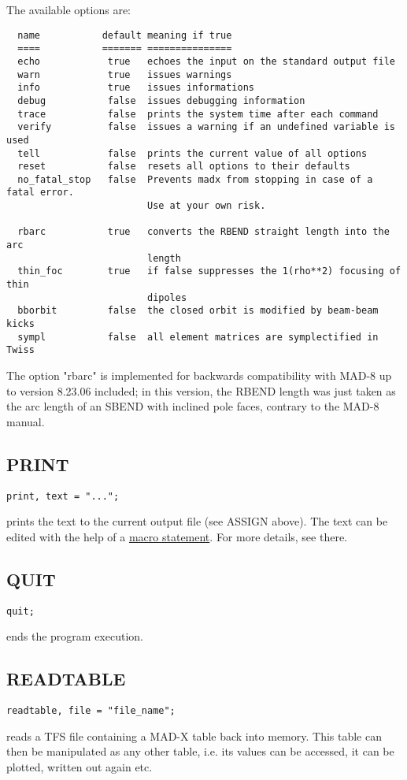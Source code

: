The available options are: 
\begin{verbatim}
  name           default meaning if true
  ====           ======= ===============
  echo            true   echoes the input on the standard output file
  warn            true   issues warnings
  info            true   issues informations
  debug           false  issues debugging information
  trace           false  prints the system time after each command
  verify          false  issues a warning if an undefined variable is used
  tell            false  prints the current value of all options
  reset           false  resets all options to their defaults
  no_fatal_stop   false  Prevents madx from stopping in case of a fatal error. 
                         Use at your own risk.

  rbarc           true   converts the RBEND straight length into the arc 
                         length
  thin_foc        true   if false suppresses the 1(rho**2) focusing of thin 
                         dipoles
  bborbit         false  the closed orbit is modified by beam-beam kicks
  sympl           false  all element matrices are symplectified in Twiss
\end{verbatim} 

The option "rbarc" is implemented for backwards compatibility with MAD-8
up to version 8.23.06 included; in this version, the RBEND length was
just taken as the arc length of an SBEND with inclined pole faces,
contrary to the MAD-8 manual.  


\subsection{PRINT}
\begin{verbatim}
print, text = "...";
\end{verbatim} 
prints the text to the current output file (see ASSIGN above). The text
can be edited with the help of a  \href{special.html#macro}{macro
  statement}. For more details, see there.  


\subsection{QUIT}
\begin{verbatim}
quit;
\end{verbatim} 
ends the program execution. 


\subsection{READTABLE}
\begin{verbatim}
readtable, file = "file_name";
\end{verbatim} 
reads a TFS file containing a MAD-X table back into memory. This table
can then be manipulated as any other table, i.e. its values can be
accessed, it can be plotted, written out again etc.  



